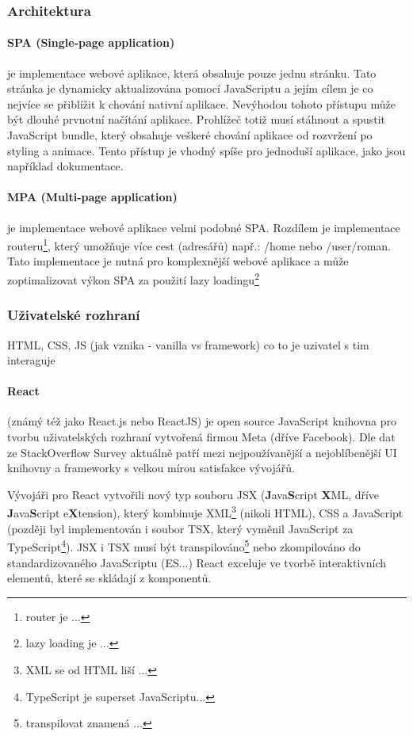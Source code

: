 \documentclass[12pt, a4paper]{article}
\begin{document}
\subsubsection{Architektura}
\paragraph{SPA (Single-page application)}
je implementace webové aplikace, která obsahuje pouze jednu stránku. Tato stránka je dynamicky aktualizována pomocí JavaScriptu a jejím cílem je co nejvíce se přiblížit k chování nativní aplikace. Nevýhodou tohoto přístupu může být dlouhé prvnotní načítání aplikace. Prohlížeč totiž musí stáhnout a spustit JavaScript bundle, který obsahuje veškeré chování aplikace od rozvržení po styling a animace. Tento přístup je vhodný spíše pro jednoduší aplikace, jako jsou například dokumentace. \cite{mozilla_foundation_spa_2023}
\paragraph{MPA (Multi-page application)}
je implementace webové aplikace velmi podobné SPA. Rozdílem je implementace routeru\footnote{router je ...}, který umožňuje více cest (adresářů) např.: /home nebo /user/roman. Tato implementace je nutná pro komplexnější webové aplikace a může zoptimalizovat výkon SPA za použití lazy loadingu\footnote{lazy loading je ...}
\subsubsection{Uživatelské rozhraní}
HTML, CSS, JS (jak vznika - vanilla vs framework)
co to je
uzivatel s tim interaguje
\paragraph{React}
(známý též jako React.js nebo ReactJS) je open source JavaScript knihovna pro tvorbu uživatelských rozhraní vytvořená firmou Meta (dříve Facebook). Dle dat ze StackOverflow Survey aktuálně patří mezi nejpoužívanější a nejoblíbenější UI knihovny a frameworky s velkou mírou satisfakce vývojářů.

Vývojáři pro React vytvořili nový typ souboru JSX (\textbf{J}ava\textbf{S}cript \textbf{X}ML, dříve \textbf{J}ava\textbf{S}cript e\textbf{X}tension), který kombinuje XML\footnote{XML se od HTML liší ...} (nikoli HTML), CSS a JavaScript (později byl implementován i soubor TSX, který vyměnil JavaScript za TypeScript\footnote{TypeScript je superset JavaScriptu...}). JSX i TSX musí být transpilováno\footnote{transpilovat znamená ...} nebo zkompilováno do standardizovaného JavaScriptu (ES...)
React exceluje ve tvorbě interaktivních elementů, které se skládají z komponentů.
\end{document}
